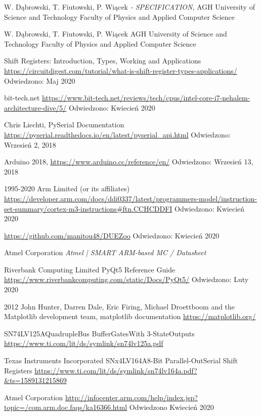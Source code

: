 \begin{thebibliography}{99}
	    W. Dąbrowski, T. Fiutowski, P. Wiącek 
	    \textit{ - SPECIFICATION},
	    AGH University of Science and Technology
        Faculty of Physics and Applied Computer Science 

	    W. Dąbrowski, T. Fiutowski, P. Wiącek 
        \textit{}
        AGH University of Science and Technology
        Faculty of Physics and Applied Computer Science 

        Shift Registers: Introduction, Types, Working and Applications
        \url{https://circuitdigest.com/tutorial/what-is-shift-register-types-applications/}
        Odwiedzono: Maj 2020

        bit-tech.net
        \url{https://www.bit-tech.net/reviews/tech/cpus/intel-core-i7-nehalem-architecture-dive/5/}
        Odwiedzono:
        Kwiecień 2020

        Chris Liechti,	
        PySerial Documentation
	\url{https://pyserial.readthedocs.io/en/latest/pyserial_api.html}
        Odwiedzono: Wrzesień 2, 2018
        
	 Arduino 2018,
	 \url{https://www.arduino.cc/reference/en/}
        Odwiedzono: Wrzesień 13, 2018	 
        
        1995-2020 Arm Limited (or its affiliates)
        \url{https://developer.arm.com/docs/ddi0337/latest/programmers-model/instruction-set-summary/cortex-m3-instructions#ftn.CCHCDDFI}
        Odwiedzono: Kwiecień 2020

        \url{https://github.com/manitou48/DUEZoo}
        Odwiedzono: Kwiecień 2020

        Atmel Corporation
        \textit{Atmel | SMART ARM-based MC  / Datasheet}

        Riverbank Computing Limited
        PyQt5 Reference Guide
        \url{https://www.riverbankcomputing.com/static/Docs/PyQt5/}
        Odwiedzono: Luty 2020

        2012 John Hunter, Darren Dale, Eric Firing, Michael Droettboom and the Matplotlib development team,
        matplotlib documentation
        \url{https://matplotlib.org/}

        SN74LV125AQuadrupleBus BufferGatesWith 3-StateOutputs
        \url{https://www.ti.com/lit/ds/symlink/sn74lv125a.pdf}

        Texas Instruments Incorporated
        SNx4LV164A8-Bit Parallel-OutSerial Shift Registers
        \url{https://www.ti.com/lit/ds/symlink/sn74lv164a.pdf?&ts=1589131215869}

        Atmel Corporation
        \url{http://infocenter.arm.com/help/index.jsp?topic=/com.arm.doc.faqs/ka16366.html}
        Odwiedzono Kwiecień 2020

\end{thebibliography}


